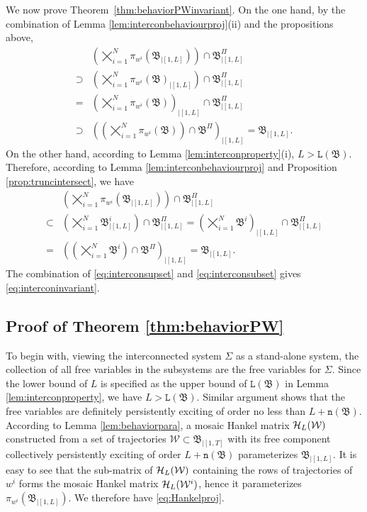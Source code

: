 \documentclass[11pt,print,draftcls,onecolumn,romanappendices]{ieeecolor}
\newcommand{\n}[1]{\mathtt{n}\left(#1\right)}
\newcommand{\lag}[1]{\mathtt{L}\left(#1\right)}
\newcommand{\proj}[2]{\pi_{#1}\left(#2\right)}
\newcommand{\revise}[1]{{\color{black} #1}}
\newcommand{\B}{\mathfrak{B}}
\newcommand{\Hk}{\mathcal{H}}
\newcommand{\bint}[1]{{|[#1]}}
\begin{document}
We now prove Theorem~\ref{thm:behaviorPWinvariant}. On the one hand, by the combination of Lemma \ref{lem:interconbehaviourproj}(ii) and the propositions above, 
\begin{equation}\label{eq:interconsupset}
	\begin{split}
		&\left(\bigtimes_{i=1}^N\proj{w^i}{\B_\bint{1,L}}\right)\cap\B^\Pi_\bint{1,L}\\
		\supset&\left(\bigtimes_{i=1}^N\proj{w^i}{\B}_\bint{1,L}\right)\cap\B^\Pi_\bint{1,L}\\
		=&\left(\bigtimes_{i=1}^N\proj{w^i}{\B}\right)_\bint{1,L}\cap\B^\Pi_\bint{1,L}\\
		\supset&\left(\left(\bigtimes_{i=1}^N\proj{w^i}{\B}\right)\cap\B^\Pi\right)_\bint{1,L}=\B_\bint{1,L}.
	\end{split}
\end{equation}
On the other hand, according to Lemma \ref{lem:interconproperty}(i), $L>\lag{\B}$. Therefore, according to Lemma \ref{lem:interconbehaviourproj} and Proposition \ref{prop:truncintersect}, we have
\begin{equation}\label{eq:interconsubset}
	\begin{split}
		&\left(\bigtimes_{i=1}^N\proj{w^i}{\B_\bint{1,L}}\right)\cap\B^\Pi_\bint{1,L}\\
		\subset&\left(\bigtimes_{i=1}^N\B^i_\bint{1,L}\right)\cap\B^\Pi_\bint{1,L}
		=\left(\bigtimes_{i=1}^N\B^i\right)_\bint{1,L}\cap\B^\Pi_\bint{1,L}\\
		=&\left(\left(\bigtimes_{i=1}^N\B^i\right)\cap\B^\Pi\right)_\bint{1,L}=\B_\bint{1,L}.
	\end{split}
\end{equation}
The combination of \eqref{eq:interconsupset} and \eqref{eq:interconsubset} gives \eqref{eq:interconinvariant}.

\subsection{Proof of Theorem \ref{thm:behaviorPW}}\label{appx:proofthm:behaviorPW}
To begin with, viewing the interconnected system $\Sigma$ as a stand-alone system, the collection of all free variables in the subsystems are the free variables for $\Sigma$. \revise{Since the lower bound of $L$ is specified as the upper bound of $\mathtt{L}(\B)$ in Lemma \ref{lem:interconproperty}, we have $L>\lag{\B}$. Similar argument shows that the free variables are definitely persistently exciting of order no less than $L+\n{\B}$.} According to Lemma \ref{lem:behaviorpara}, a mosaic Hankel matrix $\Hk_L(\revise{\mathcal{W}})$ constructed from a set of trajectories $\mathcal{W}\subset\B_\bint{1,T}$ with its free component collectively persistently exciting of order $L+\n{\B}$ parameterizes $\B_\bint{1,L}$. It is easy to see that the sub-matrix of $\Hk_L(\revise{\mathcal{W}})$ containing the rows of trajectories of $w^i$ forms the mosaic Hankel matrix $\Hk_L(\revise{\mathcal{W}}^i)$, hence it parameterizes $\proj{w^i}{\B_\bint{1,L}}$. We therefore have \eqref{eq:Hankelproj}. 
\end{document}
